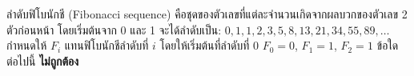 ﻿%
\question ลำดับฟิโบนักชี (Fibonacci sequence) คือชุดของตัวเลขที่แต่ละจำนวนเกิดจากผลบวกของตัวเลข 2 ตัวก่อนหน้า โดยเริ่มต้นจาก 0 และ 1 จะได้ลำดับเป็น: \(0, 1, 1, 2, 3, 5, 8, 13, 21, 34, 55, 89, \dots\) กำหนดให้ $F_{i}$ แทนฟิโบนักชีลำดับที่ $i$ โดยให้เริ่มต้นที่ลำดับที่ 0 $F_{0}=0$, $F_{1}=1$, $F_{2}=1$ ข้อใดต่อไปนี้ \textbf{ไม่ถูกต้อง}
\newline
{}

